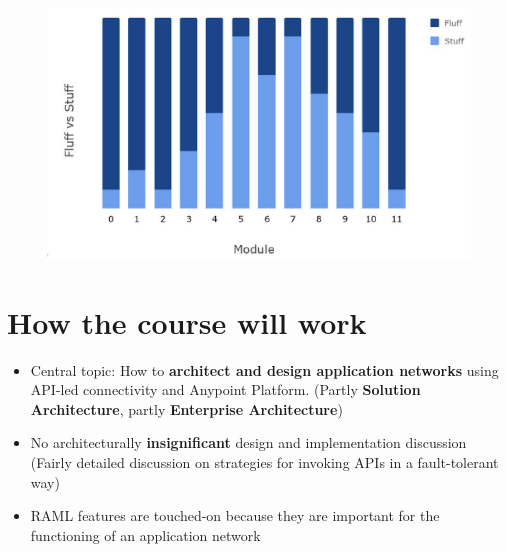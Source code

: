 \begin{figure}[h]
	
	\begin{minipage}{1\textwidth}
		\centering
		\includegraphics[width=1\linewidth]{FluffAndStuff}
	\end{minipage}
	
\end{figure}

\section{How the course will work}

\begin{itemize}
	\item Central topic: How to \textbf{architect and design application networks} using API-led connectivity and Anypoint Platform. (Partly \textbf{Solution Architecture}, partly \textbf{Enterprise Architecture})
	\item No architecturally \textbf{insignificant} design and implementation discussion
	(Fairly detailed discussion on strategies for invoking APIs in a fault-tolerant way)
	\item RAML features are touched-on because they are important for the functioning of an application network
\end{itemize}


